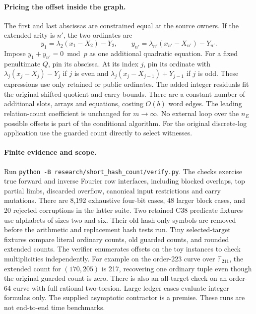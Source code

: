 \documentclass[11pt]{article}
\begin{document}
\paragraph{Pricing the offset inside the graph.}
The first and last abscissas are constrained equal at the source
owners. If the extended arity is $n'$, the two ordinates are
\[
 y_1=\lambda_2(x_1-X_2)-Y_2,\qquad
 y_{n'}=\lambda_{n'}(x_{n'}-X_{n'})-Y_{n'} .
\]
Impose $y_1+y_{n'}=0\bmod p$ as one additional quadratic equation.
For a fixed penultimate $Q$, pin its abscissa. At its index $j$, pin
its ordinate with $\lambda_j(x_j-X_j)-Y_j$ if $j$ is even and
$\lambda_j(x_j-X_{j-1})+Y_{j-1}$ if $j$ is odd. These expressions
use only retained or public ordinates. The added integer residuals
fit the original shifted quotient and carry bounds. There are a
constant number of additional slots, arrays and equations, costing
$O(b)$ word edges. The leading relation-count coefficient is unchanged
for $m\to\infty$. No external loop over the $n_E$ possible offsets is
part of the conditional algorithm. For the original discrete-log
application use the guarded count directly to select witnesses.

\paragraph{Finite evidence and scope.}
Run \texttt{python -B research/short\_hash\_count/verify.py}.
The checks exercise true forward and inverse Fourier row interfaces,
including blocked overlaps, top partial limbs, discarded overflow,
canonical input restrictions and carry mutations. There are 8,192
exhaustive four-bit cases, 48 larger block cases, and 20 rejected
corruptions in the latter suite. Two retained C38 predicate fixtures
use alphabets of sizes two and six. Their old hash-only symbols are
removed before the arithmetic and replacement hash tests run.
Tiny selected-target
fixtures compare literal ordinary counts, old guarded counts, and
rounded extended counts. The verifier enumerates offsets on the toy
instances to check multiplicities independently. For example on the
order-223 curve over $\mathbb F_{211}$, the extended count for
$(170,205)$ is 217, recovering one ordinary tuple even though the
original guarded count is zero. There is also an all-target check on
an order-64 curve with full rational two-torsion. Large ledger cases
evaluate integer formulas only. The supplied asymptotic contractor is
a premise. These runs are not end-to-end time benchmarks.
\end{document}
